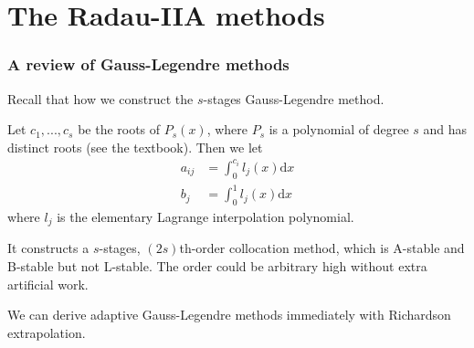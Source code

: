 \documentclass[9pt]{beamer}
\begin{document}
\section{The Radau-IIA methods}

\begin{frame}
  \frametitle{A review of Gauss-Legendre methods}

  Recall that how we construct the $s$-stages Gauss-Legendre method.

  \pause

  \vspace{1em}
  Let $c_1,...,c_s$ be the roots of $P_s(x)$, where $P_s$ is a polynomial of degree $s$ and has distinct roots (see the textbook). Then we let
  \begin{align*}
    a_{ij}&=\int_0^{c_i} l_j(x)\text{d} x\\
    b_j&=\int_0^1 l_j(x)\text{d} x
  \end{align*}
  where $l_j$ is the elementary Lagrange interpolation polynomial.

  \vspace{1em}
  It constructs a $s$-stages, $(2s)$th-order collocation method, which is A-stable and B-stable but not L-stable. The order could be arbitrary high without extra artificial work.

  \vspace{1em}
  We can derive adaptive Gauss-Legendre methods immediately with Richardson extrapolation. 
\end{frame}
\end{document}
